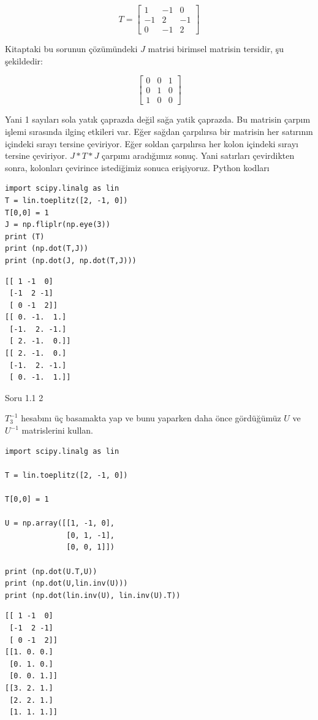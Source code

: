\documentclass[12pt,fleqn]{article}\usepackage{../../common}
\begin{document}
$$ T = 
\left[\begin{array}{rrr}
1 & -1 &  0\\
-1 & 2 & -1\\
0 & -1 & 2
\end{array}\right]
 $$

Kitaptaki bu sorunun çözümündeki $J$ matrisi birimsel matrisin tersidir, 
şu şekildedir:

$$ 
\left[\begin{array}{rrr}
0 & 0 & 1\\
0 & 1 & 0\\
1 & 0 & 0
\end{array}\right]
 $$

Yani 1 sayıları sola yatık çaprazda değil sağa yatik çaprazda. Bu matrisin
çarpım işlemi sırasında ilginç etkileri var. Eğer sağdan çarpılırsa bir
matrisin her satırının içindeki sırayı tersine çeviriyor. Eğer soldan
çarpılırsa her kolon içindeki sırayı tersine çeviriyor. $J*T*J$ çarpımı
aradığımız sonuç. Yani satırları çevirdikten sonra, kolonları çevirince
istediğimiz sonuca erişiyoruz. Python kodları

\begin{verbatim}
import scipy.linalg as lin
T = lin.toeplitz([2, -1, 0])
T[0,0] = 1
J = np.fliplr(np.eye(3))
print (T)
print (np.dot(T,J))
print (np.dot(J, np.dot(T,J)))
\end{verbatim}

\begin{verbatim}
[[ 1 -1  0]
 [-1  2 -1]
 [ 0 -1  2]]
[[ 0. -1.  1.]
 [-1.  2. -1.]
 [ 2. -1.  0.]]
[[ 2. -1.  0.]
 [-1.  2. -1.]
 [ 0. -1.  1.]]
\end{verbatim}

Soru 1.1 2

$T_3^{-1}$ hesabını üç basamakta yap ve bunu yaparken daha önce gördüğümüz
$U$ ve $U^{-1}$ matrislerini kullan.

\begin{verbatim}
import scipy.linalg as lin

T = lin.toeplitz([2, -1, 0])

T[0,0] = 1

U = np.array([[1, -1, 0],
              [0, 1, -1],
              [0, 0, 1]])

print (np.dot(U.T,U))
print (np.dot(U,lin.inv(U)))
print (np.dot(lin.inv(U), lin.inv(U).T))
\end{verbatim}

\begin{verbatim}
[[ 1 -1  0]
 [-1  2 -1]
 [ 0 -1  2]]
[[1. 0. 0.]
 [0. 1. 0.]
 [0. 0. 1.]]
[[3. 2. 1.]
 [2. 2. 1.]
 [1. 1. 1.]]
\end{verbatim}
\end{document}
